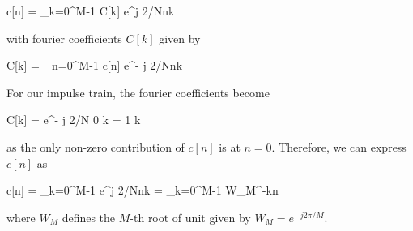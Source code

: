 \bee
c[n] =  \sum_{k=0}^{M-1} C[k] e^{j 2\pi/Nnk}
\eee

with fourier coefficients $C[k]$ given by

\bee
C[k] = \sum_{n=0}^{M-1} c[n] e^{- j 2\pi/Nnk}
\eee

For our impulse train, the fourier coefficients become

\bee
C[k] = e^{- j 2\pi/N 0 k} = 1 \quad \forall k
\eee

as the only non-zero contribution of $c[n]$ is at $n=0$. Therefore, we can express $c[n]$ as

\bee
c[n] =  \sum_{k=0}^{M-1} e^{j 2\pi/Nnk} =  \sum_{k=0}^{M-1} W_M^{-kn}
\eee

where $W_M$ defines the $M$-th root of unit given by $W_M = e^{-j 2\pi/M}$.



